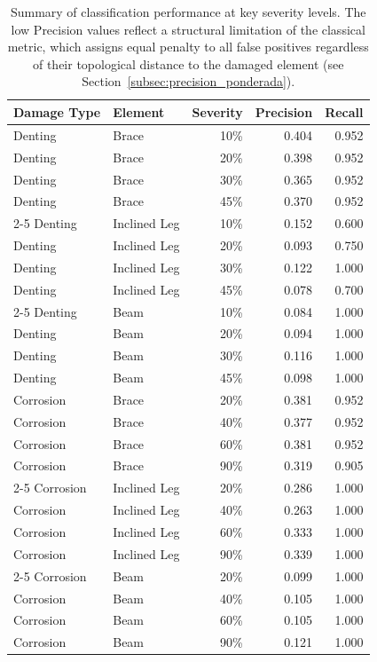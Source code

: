 \documentclass[a4paper,fleqn,nologo]{cas-dc}
\begin{document}
\begin{table}[!ht]
    \centering
    \caption{Summary of classification performance at key severity levels. The low Precision values reflect a structural limitation of the classical metric, which assigns equal penalty to all false positives regardless of their topological distance to the damaged element (see Section~\ref{subsec:precision_ponderada}).}
    \label{tab:metricas_compacta}
    \begin{tabular}{llrrr}
        \toprule
        Damage Type & Element & Severity & Precision & Recall \\
        \midrule
        Denting & Brace & 10\% & 0.404 & 0.952 \\
        Denting & Brace & 20\% & 0.398 & 0.952 \\
        Denting & Brace & 30\% & 0.365 & 0.952 \\
        Denting & Brace & 45\% & 0.370 & 0.952 \\
        \cmidrule{2-5}
        Denting & Inclined Leg & 10\% & 0.152 & 0.600 \\
        Denting & Inclined Leg & 20\% & 0.093 & 0.750 \\
        Denting & Inclined Leg & 30\% & 0.122 & 1.000 \\
        Denting & Inclined Leg & 45\% & 0.078 & 0.700 \\
        \cmidrule{2-5}
        Denting & Beam & 10\% & 0.084 & 1.000 \\
        Denting & Beam & 20\% & 0.094 & 1.000 \\
        Denting & Beam & 30\% & 0.116 & 1.000 \\
        Denting & Beam & 45\% & 0.098 & 1.000 \\
        \midrule
        Corrosion & Brace & 20\% & 0.381 & 0.952 \\
        Corrosion & Brace & 40\% & 0.377 & 0.952 \\
        Corrosion & Brace & 60\% & 0.381 & 0.952 \\
        Corrosion & Brace & 90\% & 0.319 & 0.905 \\
        \cmidrule{2-5}
        Corrosion & Inclined Leg & 20\% & 0.286 & 1.000 \\
        Corrosion & Inclined Leg & 40\% & 0.263 & 1.000 \\
        Corrosion & Inclined Leg & 60\% & 0.333 & 1.000 \\
        Corrosion & Inclined Leg & 90\% & 0.339 & 1.000 \\
        \cmidrule{2-5}
        Corrosion & Beam & 20\% & 0.099 & 1.000 \\
        Corrosion & Beam & 40\% & 0.105 & 1.000 \\
        Corrosion & Beam & 60\% & 0.105 & 1.000 \\
        Corrosion & Beam & 90\% & 0.121 & 1.000 \\
        \bottomrule
    \end{tabular}
\end{table}
\end{document}
